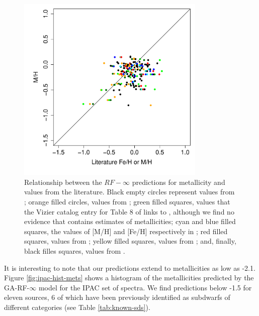 
\begin{figure}
 \begin{center}
 \includegraphics[width=9cm]{figs/ipac-figs/M-RFInf.pdf}
 \caption{Relationship between the $RF-\infty$ predictions for 
 	metallicity and values from the literature. 
 	Black empty circles represent values from \cite{cesetti}
 	; orange filled circles, values from \cite{NevesIII};  green filled 
 	squares, values that the Vizier catalog entry for Table 8 of 
 	\cite{NevesIII} links to \cite{Jao}, although we find no evidence that \cite{Jao} 
 	contains estimates of metallicities; cyan and blue filled squares, the values 
 	of [M/H] and [Fe/H] respectively in \cite{RA2012}; red filled squares, values 
 	from \cite{Mann2015}; yellow filled squares,  values from \cite{Newton2014}; and, 
 	finally, black filles squares, values from \cite{Gaidos2015}.}
 \label{fig:ipac_mt}
 \end{center}
\end{figure}


It is interesting to note that our predictions extend to metallicities as low as -2.1. Figure \ref{fig:ipac-hist-mets} shows a histogram of the metallicities predicted by the GA-RF-$\infty$ model for the IPAC set of spectra. We find predictions below -1.5 for eleven sources, 6 of which have been previously identified as subdwarfs of different categories (see Table \ref{tab:known-sds}).  

